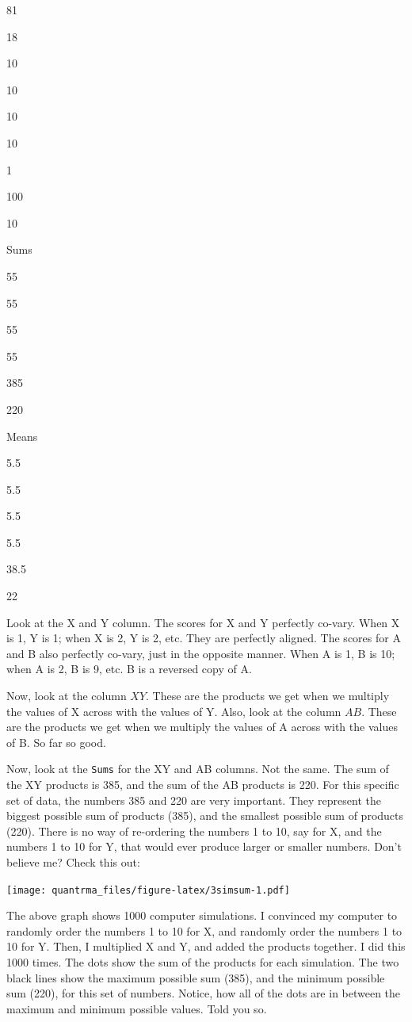 \documentclass[
]{book}
\begin{document}
81

18

10

10

10

10

1

100

10

Sums

55

55

55

55

385

220

Means

5.5

5.5

5.5

5.5

38.5

22

Look at the X and Y column. The scores for X and Y perfectly co-vary. When X is 1, Y is 1; when X is 2, Y is 2, etc. They are perfectly aligned. The scores for A and B also perfectly co-vary, just in the opposite manner. When A is 1, B is 10; when A is 2, B is 9, etc. B is a reversed copy of A.

Now, look at the column \(XY\). These are the products we get when we multiply the values of X across with the values of Y. Also, look at the column \(AB\). These are the products we get when we multiply the values of A across with the values of B. So far so good.

Now, look at the \texttt{Sums} for the XY and AB columns. Not the same. The sum of the XY products is 385, and the sum of the AB products is 220. For this specific set of data, the numbers 385 and 220 are very important. They represent the biggest possible sum of products (385), and the smallest possible sum of products (220). There is no way of re-ordering the numbers 1 to 10, say for X, and the numbers 1 to 10 for Y, that would ever produce larger or smaller numbers. Don't believe me? Check this out:

\texttt{[image: quantrma\_files/figure-latex/3simsum-1.pdf]}

The above graph shows 1000 computer simulations. I convinced my computer to randomly order the numbers 1 to 10 for X, and randomly order the numbers 1 to 10 for Y. Then, I multiplied X and Y, and added the products together. I did this 1000 times. The dots show the sum of the products for each simulation. The two black lines show the maximum possible sum (385), and the minimum possible sum (220), for this set of numbers. Notice, how all of the dots are in between the maximum and minimum possible values. Told you so.
\end{document}
